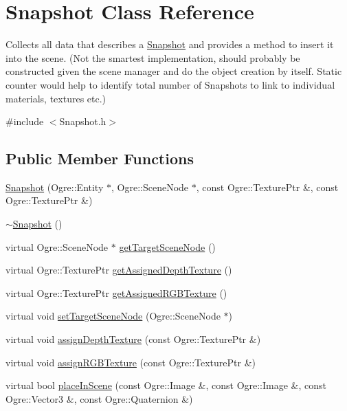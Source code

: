 \hypertarget{classSnapshot}{\section{\-Snapshot \-Class \-Reference}
\label{classSnapshot}
}


\-Collects all data that describes a \hyperlink{classSnapshot}{\-Snapshot} and provides a method to insert it into the scene. (\-Not the smartest implementation, should probably be constructed given the scene manager and do the object creation by itself. \-Static counter would help to identify total number of \-Snapshots to link to individual materials, textures etc.)  




{\ttfamily \#include $<$\-Snapshot.\-h$>$}

\subsection*{\-Public \-Member \-Functions}
\begin{DoxyCompactItemize}
\item 
\hyperlink{classSnapshot_ac23b92a6b8dba7231deb0eabe380f7f4}{\-Snapshot} (\-Ogre\-::\-Entity $\ast$, \-Ogre\-::\-Scene\-Node $\ast$, const \-Ogre\-::\-Texture\-Ptr \&, const \-Ogre\-::\-Texture\-Ptr \&)
\item 
\hyperlink{classSnapshot_ac9793a7337c8b514c7679eb0a82b9328}{$\sim$\-Snapshot} ()
\item 
virtual \-Ogre\-::\-Scene\-Node $\ast$ \hyperlink{classSnapshot_ade78092b22032565fd191442be26106e}{get\-Target\-Scene\-Node} ()
\item 
virtual \-Ogre\-::\-Texture\-Ptr \hyperlink{classSnapshot_a2d025a7e4000ea6da3333d5f85127b14}{get\-Assigned\-Depth\-Texture} ()
\item 
virtual \-Ogre\-::\-Texture\-Ptr \hyperlink{classSnapshot_aec0736e686c5fb103dc4e0e4133c1df0}{get\-Assigned\-R\-G\-B\-Texture} ()
\item 
virtual void \hyperlink{classSnapshot_afa35ce833d0b5668eb04436bd581f2c0}{set\-Target\-Scene\-Node} (\-Ogre\-::\-Scene\-Node $\ast$)
\item 
virtual void \hyperlink{classSnapshot_ae21564f3fe2cc65bba44d25bb691ffb5}{assign\-Depth\-Texture} (const \-Ogre\-::\-Texture\-Ptr \&)
\item 
virtual void \hyperlink{classSnapshot_a55c7abcd9c234bb0fe9a0dc22786fdae}{assign\-R\-G\-B\-Texture} (const \-Ogre\-::\-Texture\-Ptr \&)
\item 
virtual bool \hyperlink{classSnapshot_ad3c7ad06b61678ded3dd022aab511ec4}{place\-In\-Scene} (const \-Ogre\-::\-Image \&, const \-Ogre\-::\-Image \&, const \-Ogre\-::\-Vector3 \&, const \-Ogre\-::\-Quaternion \&)
\end{DoxyCompactItemize}
